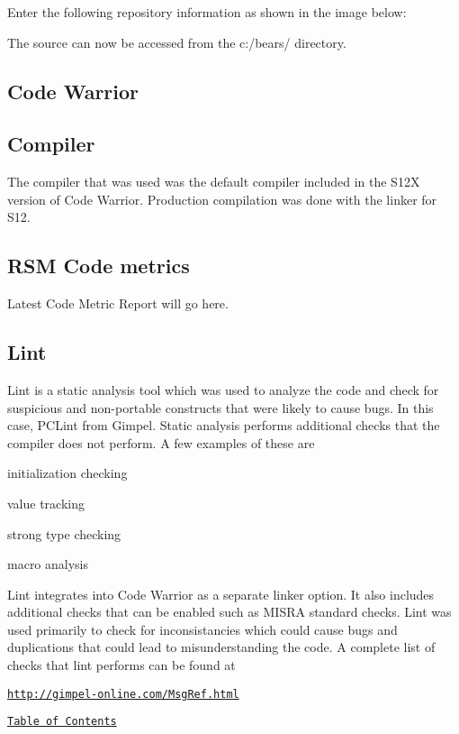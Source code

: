 Enter the following repository information as shown in the image below\-:



The source can now be accessed from the c\-:/bears/ directory.\hypertarget{index_CodeWarrior}{}\subsection{Code Warrior}\label{index_CodeWarrior}
\hypertarget{index_Compiler}{}\subsection{Compiler}\label{index_Compiler}
The compiler that was used was the default compiler included in the S12\-X version of Code Warrior. Production compilation was done with the linker for S12.\hypertarget{index_RSM}{}\subsection{R\-S\-M Code metrics}\label{index_RSM}
Latest Code Metric Report will go here.\hypertarget{index_Lint}{}\subsection{Lint}\label{index_Lint}
Lint is a static analysis tool which was used to analyze the code and check for suspicious and non-\/portable constructs that were likely to cause bugs. In this case, P\-C\-Lint from Gimpel. Static analysis performs additional checks that the compiler does not perform. A few examples of these are
\begin{DoxyItemize}
\item initialization checking
\item value tracking
\item strong type checking
\item macro analysis
\end{DoxyItemize}

Lint integrates into Code Warrior as a separate linker option. It also includes additional checks that can be enabled such as M\-I\-S\-R\-A standard checks. Lint was used primarily to check for inconsistancies which could cause bugs and duplications that could lead to misunderstanding the code. A complete list of checks that lint performs can be found at \par


\href{http://gimpel-online.com/MsgRef.html}{\tt http\-://gimpel-\/online.\-com/\-Msg\-Ref.\-html}

\par
\href{#Contents}{\tt Table of Contents}\par
 

 